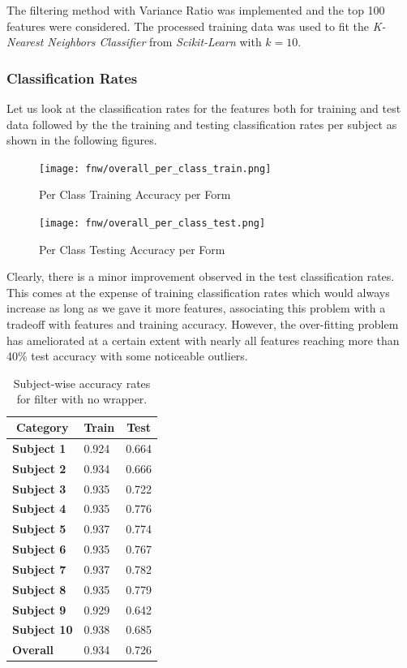\documentclass[12pt,twoside,a4paper]{article}
\begin{document}
The filtering method with Variance Ratio was implemented and the top 100 features were considered. The processed training data was used to fit the \textit{K-Nearest Neighbors Classifier} from \textit{Scikit-Learn} with $k=10$.

\subsubsection*{Classification Rates}
Let us look at the classification rates for the features both for training and test data followed by the the training and testing classification rates per subject as shown in the following figures.

\begin{figure}[H]
    \centering
    \texttt{[image: fnw/overall\_per\_class\_train.png]}
    \caption{Per Class Training Accuracy per Form}
    \label{fig: F1}
\end{figure}

\begin{figure}[H]
    \centering
    \texttt{[image: fnw/overall\_per\_class\_test.png]}
    \caption{Per Class Testing Accuracy per Form}
    \label{fig: F2}
\end{figure}

Clearly, there is a minor improvement observed in the test classification rates. This comes at the expense of training classification rates which would always increase as long as we gave it more features, associating this problem with a tradeoff with features and training accuracy. However, the over-fitting problem has ameliorated at a certain extent with nearly all features reaching more than 40\% test accuracy with some noticeable outliers.

\begin{table}[H]
\centering
\begin{tabular}{|l|l|l|}
\hline
\multicolumn{1}{|c|}{\textbf{Category}} & \multicolumn{1}{c|}{\textbf{Train}} & \multicolumn{1}{c|}{\textbf{Test}} \\ \hline
\textbf{Subject 1}  & 0.924 & 0.664 \\ \hline
\textbf{Subject 2}  & 0.934 & 0.666 \\ \hline
\textbf{Subject 3}  & 0.935 & 0.722 \\ \hline
\textbf{Subject 4}  & 0.935 & 0.776 \\ \hline
\textbf{Subject 5}  & 0.937 & 0.774 \\ \hline
\textbf{Subject 6}  & 0.935 & 0.767 \\ \hline
\textbf{Subject 7}  & 0.937 & 0.782 \\ \hline
\textbf{Subject 8}  & 0.935 & 0.779 \\ \hline
\textbf{Subject 9}  & 0.929 & 0.642 \\ \hline
\textbf{Subject 10} & 0.938 & 0.685 \\ \hline
\textbf{Overall}    & 0.934 & 0.726 \\ \hline
\end{tabular}
\caption{Subject-wise accuracy rates for filter with no wrapper.}
\label{tab:FNWT}
\end{table}
\end{document}
